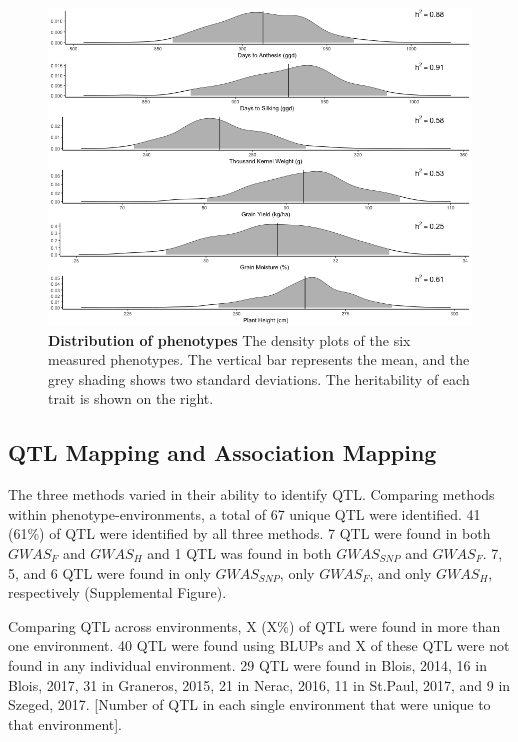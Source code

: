 \documentclass[article,9pt,twocolumn,twoside]{rilabRxiv}
\begin{document}
\begin{figure}[ht]
\centering
\includegraphics[width=\linewidth]{figures/Methods_Fig2.png}
\caption{\textbf{Distribution of phenotypes} The density plots of the six measured phenotypes. The vertical bar represents the mean, and the grey shading shows two standard deviations. The heritability of each trait is shown on the right.}
\label{fig:figure2}
\end{figure}

\subsection{QTL Mapping and Association Mapping}
The three methods varied in their ability to identify QTL.
Comparing methods within phenotype-environments, a total of 67 unique QTL were identified. 41 (61\%) of QTL were identified by all three methods. 7 QTL were found in both $GWAS_F$ and $GWAS_H$ and 1 QTL was found in both $GWAS_{SNP}$ and $GWAS_F$. 7, 5, and 6 QTL were found in only $GWAS_{SNP}$, only $GWAS_F$, and only $GWAS_H$, respectively (Supplemental Figure).

Comparing QTL across environments, X (X\%) of QTL were found in more than one environment. 40 QTL were found using BLUPs and X of these QTL were not found in any individual environment. 29 QTL were found in Blois, 2014, 16 in Blois, 2017, 31 in Graneros, 2015, 21 in Nerac, 2016, 11 in St.Paul, 2017, and 9 in Szeged, 2017. [Number of QTL in each single environment that were unique to that environment].

\end{document}
